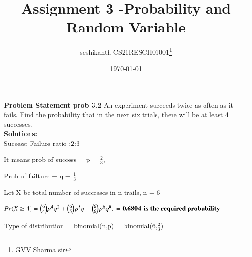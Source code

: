 \documentclass[journal,12pt,twocoloums]{IEEEtran}
\begin{document}
 \maketitle
 

\title{Assignment 3 -Probability and Random Variable}
\author{seshikanth CS21RESCH01001\thanks{GVV Sharma sir}}
\date{\today}

 \textbf{Problem Statement prob 3.2}-An experiment succeeds twice as often
as it fails. Find the probability that in the next six trials, there will be at least 4 successes.\\
\textbf{Solutions:}\\

Success: Failure ratio :2:3

It means prob of success = p = $\frac{2}{3}$, 

Prob of failture = q  = $\frac{1}{3}$

Let X be total number of successes in n trails, n = 6

$Pr(X \geq 4) = { 6 \choose 4} p^{4} q^2 + { 6 \choose 5} p^{5} q + { 6 \choose 6} p^{6} q^0,  \\
              = \textbf{0.6804},  \textbf{is the required probability}
$

Type of distribution = binomial(n,p) = binomial(6,$\frac{2}{3}$)
\end{document}
